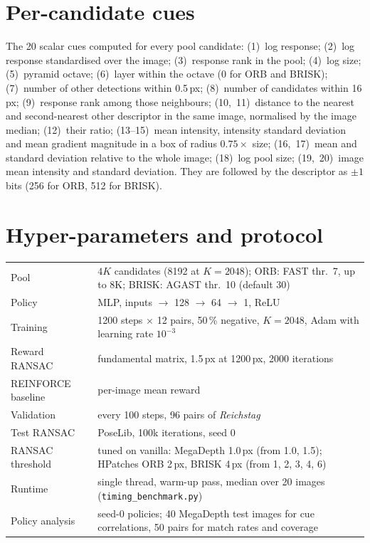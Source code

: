 \documentclass[10pt,twocolumn,letterpaper]{article}
\begin{document}
\section{Per-candidate cues}
\label{app:cues}
The 20 scalar cues computed for every pool candidate:
(1)~log response; (2)~log response standardised over the image; (3)~response rank in the pool; (4)~log size;
(5)~pyramid octave; (6)~layer within the octave (0 for ORB and BRISK); (7)~number of other detections within
0.5\,px; (8)~number of candidates within 16\,px; (9)~response rank among those neighbours; (10,~11)~distance to
the nearest and second-nearest other descriptor in the same image, normalised by the image median; (12)~their
ratio; (13--15)~mean intensity, intensity standard deviation and mean gradient magnitude in a box of radius
$0.75\times$ size; (16,~17)~mean and standard deviation relative to the whole image; (18)~log pool size;
(19,~20)~image mean intensity and standard deviation. They are followed by the descriptor as $\pm1$ bits (256 for
ORB, 512 for BRISK).

\section{Hyper-parameters and protocol}
\label{app:hparams}
\begin{center}
\small
\begin{tabular}{@{}ll@{}}
\toprule
Pool & $4K$ candidates (8192 at $K{=}2048$); ORB: FAST thr.\ 7, up to 8K; BRISK: AGAST thr.\ 10 (default 30) \\
Policy & MLP, inputs $\to$ 128 $\to$ 64 $\to$ 1, ReLU \\
Training & 1200 steps $\times$ 12 pairs, 50\,\% negative, $K{=}2048$, Adam with learning rate $10^{-3}$ \\
Reward RANSAC & fundamental matrix, 1.5\,px at 1200\,px, 2000 iterations \\
REINFORCE baseline & per-image mean reward \\
Validation & every 100 steps, 96 pairs of \emph{Reichstag} \\
Test RANSAC & PoseLib, 100k iterations, seed 0 \\
RANSAC threshold & tuned on vanilla: MegaDepth 1.0\,px (from 1.0, 1.5); HPatches ORB 2\,px, BRISK 4\,px (from 1, 2, 3, 4, 6) \\
Runtime & single thread, warm-up pass, median over 20 images (\texttt{timing\_benchmark.py}) \\
Policy analysis & seed-0 policies; 40 MegaDepth test images for cue correlations, 50 pairs for match rates and coverage \\
\bottomrule
\end{tabular}
\label{tab:hparams}
\end{center}
\end{document}
